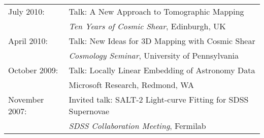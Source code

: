 {\begin{tabular}{ll}
   July 2010:     & Talk: A New Approach to Tomographic Mapping\\
                  & \hspace{1cm} {\it Ten Years of Cosmic Shear},
                    Edinburgh, UK\\
   April 2010:    & Talk: New Ideas for 3D Mapping with Cosmic Shear\\
                  & \hspace{1cm} {\it Cosmology Seminar},
                    University of Pennsylvania\\
   October 2009:  & Talk: Locally Linear Embedding of Astronomy Data\\
                  &  \hspace{1cm} Microsoft Research, Redmond, WA\\
   November 2007: & Invited talk: 
                    SALT-2 Light-curve Fitting for SDSS Supernovae\\
                  & \hspace{1cm} {\it SDSS Collaboration Meeting}, Fermilab\\
\end{tabular}

}
